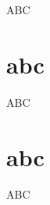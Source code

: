 \documentclass{iitthesis}
\def\bE{\mathbb{E}}
\def\bP{\mathbb{P}}
\def\cN{\mathcal{N}}
\def\cT{\mathcal{T}}
\def\bE{\mathbb{E}}
\def\bP{\mathbb{P}}
\def\mH{\mathsf{H}}
\begin{document}



\begin{abstract}           %
TBD
\end{abstract}


\textpages     %

%
%

ABC

\section{abc}


ABC

\section{abc}

ABC


\end{document}
